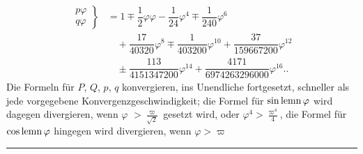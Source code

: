 \[
\begin{aligned}
\left.\begin{matrix}p\varphi\\q\varphi\end{matrix}\right\}
&=1\mp\dfrac12\varphi\varphi-\dfrac1{24}\varphi^4\mp\dfrac1{240}\varphi^6\\[6pt]&\quad{}+\dfrac{17}{40320}\varphi^8\mp\dfrac1{403200}\varphi^{10}+\dfrac{37}{159667200}\varphi^{12}\\[6pt]
&\quad\pm\dfrac{113}{4151347200}\varphi^{14}+\dfrac{4171}{6974263296000}\varphi^{16}\mathord{.}\mathord{.}
\end{aligned}
\]
Die Formeln für $P$, $Q$, $p$, $q$ konvergieren, ins Unendliche fortgesetzt, schneller als jede vorgegebene Konvergenzgeschwindigkeit; die Formel für $\operatorname{sin\,lemn}\varphi$ wird dagegen divergieren, wenn $\varphi$ $>\frac{\varpi}{\surd2}$ gesetzt wird, oder $\varphi^4>\frac{\varpi^4}{4}$, die Formel für $\operatorname{cos\,lemn}\varphi$ hingegen wird divergieren, wenn $\varphi>\varpi$
\par\begin{center}\rule{.22\linewidth}{.3pt}\end{center}
\clearpage
\endgroup
